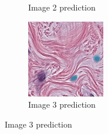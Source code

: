 \begin{figure}[H]
\begin{subfigure}[b]{0.32\textwidth}
    \caption{Image 2 prediction}
  \end{subfigure}\hfill
  \begin{subfigure}[b]{0.32\textwidth}
    \centering
    \includegraphics[width=\linewidth]{assets/images/for_presentation/exp2-3-pred.png}
    \caption{Image 3 prediction}
  \end{subfigure}

  \par\vspace{0.5em}


\end{figure}
